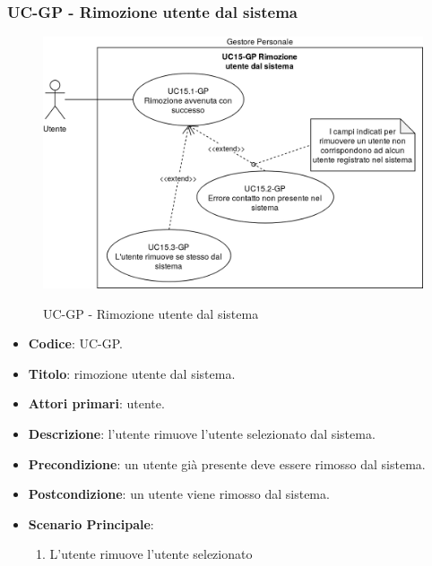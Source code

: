 \subsubsection{UC\theuccount-GP - Rimozione utente dal sistema}
		\begin{figure}[H]
			\centering
				\includegraphics[width=\columnwidth]{img/casi_d'uso/UC15.png}\\
			\caption{UC\theuccount-GP - Rimozione utente dal sistema}
		\end{figure}
	\begin{itemize}
		\item \textbf{Codice}: UC\theuccount-GP.
		\item \textbf{Titolo}: rimozione utente dal sistema.
		\item \textbf{Attori primari}: utente.
		\item \textbf{Descrizione}: l'utente rimuove l'utente selezionato dal sistema.
		\item \textbf{Precondizione}: un utente già presente deve essere rimosso dal sistema.
		\item \textbf{Postcondizione}: un utente viene rimosso dal sistema.
		\item \textbf{Scenario Principale}:
		\begin{enumerate}
			\item L'utente rimuove l'utente selezionato
		\end{enumerate}
\end{itemize}
	
